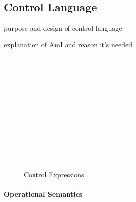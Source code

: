 \subsection{Control Language}
\label{sec:control-lang}

\todo purpose and design of control language

\todo explanation of AmI and reason it's needed

\begin{figure}
  \begin{syntax}
     \alternative{\CtrlFail}     \\
     \alternative{\RecvFrom{\ell}} \\
    \\
     \\
     \\
      \\
    \\
    \\
    \\
    \\
    \\

    \category[Systems]{\Pi}
  \end{syntax}

  \caption{Control Expressions}
  \label{fig:control-lang-syntax}
\end{figure}

\paragraph{Operational Semantics}
\label{sec:control-lang-semantics}

